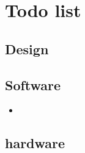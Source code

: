 \documentclass{article}
\begin{document}
\section{Todo list}

\subsection{Design}

\subsection{Software}
\begin{itemize}
  \item  
\end{itemize}

\subsection{hardware}
\end{document}
